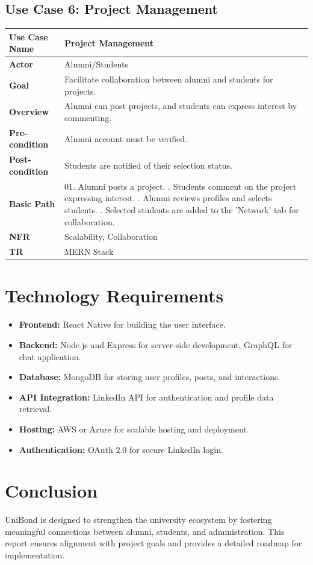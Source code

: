 \documentclass[a4paper,12pt]{article}
\begin{document}
\subsection{Use Case 6: Project Management}
\begin{longtable}{|l|p{12cm}|}
\hline
\textbf{Use Case Name} & Project Management \\ \hline
\textbf{Actor} & Alumni/Students \\ \hline
\textbf{Goal} & Facilitate collaboration between alumni and students for projects. \\ \hline
\textbf{Overview} & Alumni can post projects, and students can express interest by commenting. \\ \hline
\textbf{Pre-condition} & Alumni account must be verified. \\ \hline
\textbf{Post-condition} & Students are notified of their selection status. \\ \hline
\textbf{Basic Path} & 
01. Alumni posts a project. \newline
02. Students comment on the project expressing interest. \newline
03. Alumni reviews profiles and selects students. \newline
04. Selected students are added to the 'Network' tab for collaboration. \\ \hline
\textbf{NFR} & Scalability, Collaboration \\ \hline
\textbf{TR} & MERN Stack \\ \hline
\end{longtable}

\newpage
\section{Technology Requirements}
\begin{itemize}
    \item \textbf{Frontend:} React Native for building the user interface.
    \item \textbf{Backend:} Node.js and Express for server-side development, GraphQL for chat application.
    \item \textbf{Database:} MongoDB for storing user profiles, posts, and interactions.
    \item \textbf{API Integration:} LinkedIn API for authentication and profile data retrieval.
    \item \textbf{Hosting:} AWS or Azure for scalable hosting and deployment.
    \item \textbf{Authentication:} OAuth 2.0 for secure LinkedIn login.
\end{itemize}


\section{Conclusion}
UniBond is designed to strengthen the university ecosystem by fostering meaningful connections between alumni, students, and administration. This report ensures alignment with project goals and provides a detailed roadmap for implementation.
\end{document}
